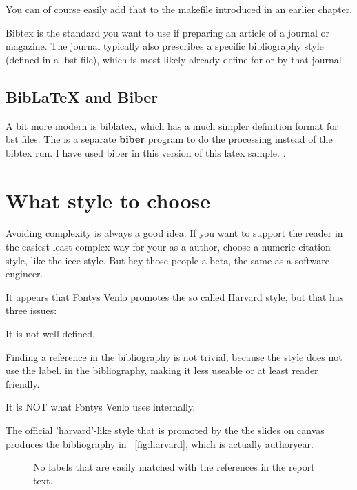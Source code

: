 You can of course easily add that to the makefile introduced in an
earlier chapter.

Bibtex is the standard you want to use if preparing an article of a
journal or magazine. The journal typically also prescribes a specific
bibliography style (defined in a .bst file), which is most likely
already define for or by that journal

\subsection{BibLaTeX and Biber}

A bit more modern is biblatex, which has a much simpler definition
format for bst files. The is a separate \textbf{biber} program to do
the processing instead of the bibtex run.
I have used biber in this version of this latex sample. \parencite{biblatexsite}.

\section{What style to choose}

Avoiding complexity is always a good idea. If you want to support the reader in the easiest least complex way for your as a author, choose a numeric citation style,
like the ieee style. But hey those people a beta, the same as a software engineer.


It appears that Fontys Venlo promotes the so called Harvard style, but that has three issues:
\begin{Enumerate}
\item It is not well defined.
\item Finding a reference in the bibliography is not trivial, because the style does not use the label.
  in the bibliography, making it less useable or at least reader friendly.
\item It is NOT what Fontys Venlo uses internally.
\end{Enumerate}


The official 'harvard'-like style that is promoted by the the slides on canvas
produces the bibliography in ~\vref{fig:harvard}, which is actually authoryear.

\begin{figure}
  \caption{\label{fig:harvard}No labels that are easily matched with the references in the report text.}
\end{figure}

